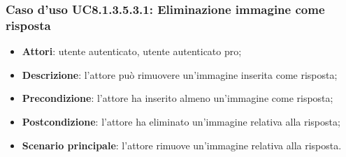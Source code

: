 \subsubsection{Caso d'uso UC8.1.3.5.3.1: Eliminazione immagine come risposta}
\begin{itemize}
	\item\textbf{Attori}: utente autenticato, utente autenticato pro;
	\item\textbf{Descrizione}: l'attore può rimuovere un'immagine inserita come risposta;
	\item\textbf{Precondizione}: l'attore ha inserito almeno un'immagine come risposta; 
	\item \textbf{Postcondizione}: l'attore ha eliminato un'immagine relativa alla risposta;
	\item\textbf{Scenario principale}: l'attore rimuove un'immagine relativa alla risposta. 
\end{itemize}
